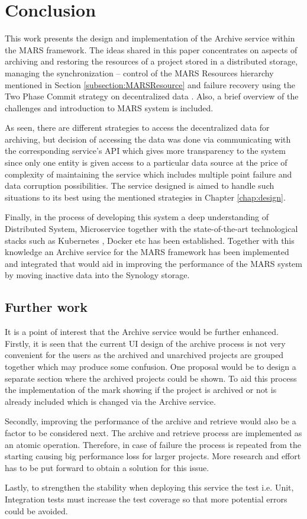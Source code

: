 \chapter{Conclusion}
This work presents the design and implementation of the Archive service within the MARS framework. The ideas shared
in this paper concentrates on aspects of archiving and restoring the resources of a project stored in a distributed storage, managing the synchronization
-- control of the MARS Resources hierarchy mentioned in Section \ref{subsection:MARSResource} and failure recovery using the Two Phase Commit strategy
on decentralized data \cite{atomic}.
Also, a brief overview of the challenges and introduction to MARS system is included.

As seen, there are different strategies to access the decentralized data for archiving, but decision of accessing the data was done via communicating
with the corresponding service's API which gives more transparency to the system since only one entity is given access to a particular data source at the price of 
complexity of maintaining the service which includes multiple point failure and data corruption possibilities. The service designed is aimed to handle such situations
to its best using the mentioned strategies in Chapter \ref{chap:design}.

Finally, in the process of developing this system a deep understanding of Distributed System, Microservice together with the state-of-the-art technological stacks
such as Kubernetes \cite{kubernetes}, Docker etc has been established. Together with this knowledge an Archive service for the MARS framework has been implemented and integrated 
that would aid in improving the performance of the MARS system by moving inactive data into the Synology storage.

\section{Further work}
It is a point of interest that the Archive service would be further enhanced. Firstly, it is seen that the current UI design of the archive process is not very convenient
for the users as the archived and unarchived projects are grouped together which may produce some confusion. One proposal would be to design a separate section
where the archived projects could be shown. To aid this process the implementation of the mark showing if the project is archived or not is already included which is
changed via the Archive service. 

Secondly, improving the performance of the archive and retrieve would also be a factor to be considered next. The archive and retrieve process are implemented as
an atomic operation. Therefore, in case of failure the process is repeated from the starting causing big performance loss for larger projects. More research and effort
has to be put forward to obtain a solution for this issue. 

Lastly, to strengthen the stability when deploying this service the test i.e. Unit, Integration tests must increase the test coverage so that more potential
errors could be avoided. 


